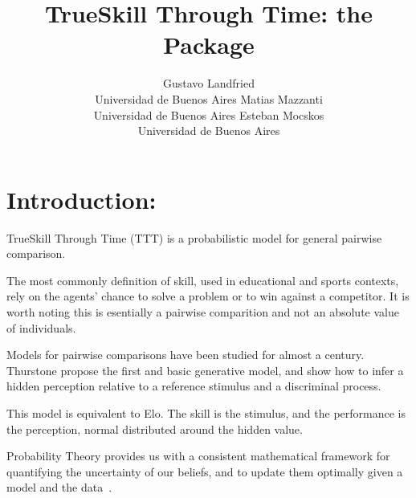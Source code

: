\documentclass[article]{jss}
\author{Gustavo Landfried \\Universidad de Buenos Aires
   \And Matias Mazzanti \\Universidad de Buenos Aires 
   \And Esteban Mocskos \\Universidad de Buenos Aires}
\title{TrueSkill Through Time: the \proglang{Python} Package}
\begin{document}
\lstset{language=Python}    



\section[Introduction: Count data regression in R]{Introduction: } \label{sec:intro}

TrueSkill Through Time (TTT) is a probabilistic model for general pairwise comparison.

The most commonly definition of skill, used in educational and sports contexts, rely on the agents' chance to solve a problem or to win against a competitor.
It is worth noting this is esentially a pairwise comparition and not an absolute value of individuals.

Models for pairwise comparisons have been studied for almost a century.
Thurstone \cite{thurstone1927-psychophysicalAnalysis,thurstone1927-comparativeJugement} propose the first and basic generative model, and show how to infer a hidden perception relative to a reference stimulus and a discriminal process.



\cite{glickman2013-zermelo1928}

This model is equivalent to Elo. The skill is the stimulus, and the performance is the perception, normal distributed around the hidden value.





Probability Theory provides us with a consistent mathematical framework  for quantifying the uncertainty of our beliefs, and to update them optimally given a model and the data~\cite{bishop2006-patternRecognitionMachineLearning}.
\end{document}
